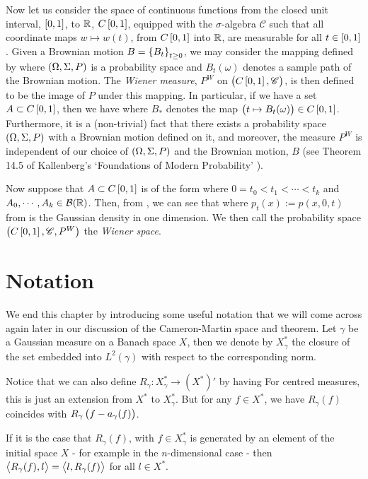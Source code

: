 \documentclass[../main.tex]{subfiles}
\begin{document}
Now let us consider the space of continuous functions from the closed unit interval, $\intcc{0,1}$, to $\operatorname{\mathbb{R}}$, $C\intcc{0,1}$, equipped with the $\sigma$-algebra $\mathscr{C}$ such that all coordinate maps $w\mapsto w(t)$, from $C\intcc{0,1}$ into $\operatorname{\mathbb{R}}$, are measurable for all $t\in\intcc{0,1}$. Given a Brownian motion $B = \cbr{B_t}_{t\geq0}$, we may consider the mapping defined by  where $\del{\Omega,\Sigma,P}$ is a probability space and $B_t(\omega)$ denotes a sample path of the Brownian motion. The \emph{Wiener measure}, $P^W$ on $\del{C\intcc{0,1},\mathscr{C}}$, is then defined to be the image of $P$ under this mapping. In particular, if we have a set $A\subset C\intcc{0,1}$, then we have  where $B_*$ denotes the map $\del{t\mapsto B_t(\omega)}\in C\intcc{0,1}$. Furthermore, it is a (non-trivial) fact that there exists a probability space $\del{\Omega,\Sigma, P}$ with a Brownian motion defined on it, and moreover, the measure $P^W$ is independent of our choice of $\del{\Omega,\Sigma,P}$ and the Brownian motion, $B$ (see Theorem 14.5 of Kallenberg's `Foundations of Modern Probability' \cite{Kallenberg2021}).

Now suppose that $A\subset C\intcc{0,1}$ is of the form  where $0=t_0<t_1<\cdots<t_k$ and $A_0,\cdots,A_k\in\mathcal{B}(\operatorname{\mathbb{R}})$. Then, from , we can see that  where $p_t(x):= p(x,0,t)$ from  is the Gaussian density in one dimension. We then call the probability space $\del{C\intcc{0,1},\mathscr{C},P^W}$ the \emph{Wiener space}.

\section{Notation}
We end this chapter by introducing some useful notation that we will come across again later in our discussion of the Cameron-Martin space and theorem. Let $\gamma$ be a Gaussian measure on a Banach space $X$, then we denote by $X_\gamma^*$ the closure of the set  embedded into $L^2(\gamma)$ with respect to the corresponding norm. 

Notice that we can also define $R_\gamma:X_\gamma^*\to (X^*)'$ by having  For centred measures, this is just an extension from $X^*$ to $X_\gamma^*$. But for any $f\in X^*$, we have $R_\gamma(f)$ coincides with $R_\gamma\left( f-a_\gamma(f) \right)$. 

If it is the case that $R_\gamma(f)$, with $f\in X_\gamma^*$ is generated by an element of the initial space $X$ - for example in the $n$-dimensional case - then $\left\langle R_\gamma(f),l \right\rangle = \left\langle l,R_\gamma(f) \right\rangle$ for all $l\in X^*$.
    
\end{document}
